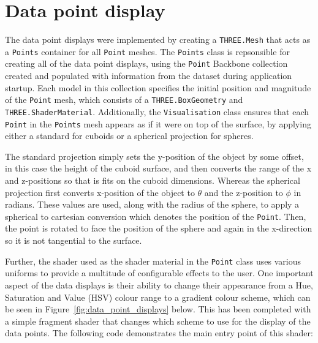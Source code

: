 \section{Data point display} {
\label{sec:data_point_display}

	The data point displays were implemented by creating a \texttt{THREE.Mesh} that acts as a \texttt{Points} container for all \texttt{Point} meshes. The \texttt{Points} class is repsonsible for creating all of the data point displays, using the \texttt{Point} Backbone collection created and populated with information from the dataset during application startup. Each model in this collection specifies the initial position and magnitude of the \texttt{Point} mesh, which consists of a \texttt{THREE.BoxGeometry} and \texttt{THREE.ShaderMaterial}. Additionally, the \texttt{Visualisation} class ensures that each \texttt{Point} in the \texttt{Points} mesh appears as if it were on top of the surface, by applying either a standard for cuboids or a spherical projection for spheres.

	The standard projection simply sets the y-position of the object by some offset, in this case the height of the cuboid surface, and then converts the range of the x and z-positions so that is fits on the cuboid dimensions. Whereas the spherical projection first converts x-position of the object to $\theta$ and the z-position to $\phi$ in radians. These values are used, along with the radius of the sphere, to apply a spherical to cartesian conversion which denotes the position of the \texttt{Point}. Then, the point is rotated to face the position of the sphere and again in the x-direction so it is not tangential to the surface.

	Further, the shader used as the shader material in the \texttt{Point} class uses various uniforms to provide a multitude of configurable effects to the user. One important aspect of the data displays is their ability to change their appearance from a Hue, Saturation and Value (HSV) colour range to a gradient colour scheme, which can be seen in Figure~\ref{fig:data_point_displays} below. This has been completed with a simple fragment shader that changes which scheme to use for the display of the data points. The following code demonstrates the main entry point of this shader:

	

	

}


